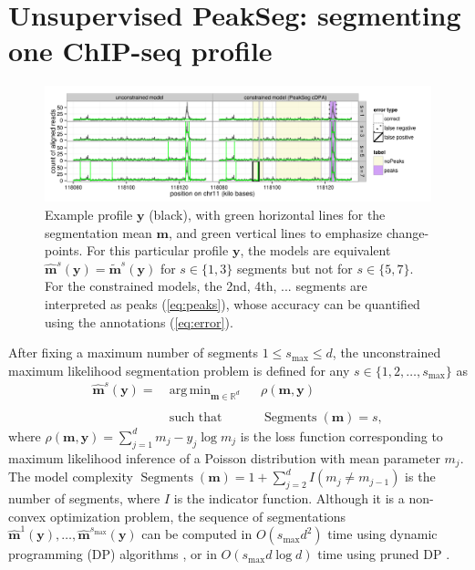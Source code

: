 \documentclass{article}
\DeclareMathOperator*{\argmin}{arg\,min}
\DeclareMathOperator*{\Segments}{Segments}
\newcommand{\RR}{\mathbb R}
\begin{document}
\section{Unsupervised PeakSeg: segmenting one ChIP-seq profile}

\begin{figure}[b!]
  \centering
  \includegraphics[width=\textwidth]{figure-Segmentor-PeakSeg}
  \vskip -0.5cm
  \caption{Example profile $\mathbf y$ (black), with green horizontal
    lines for the segmentation mean $\mathbf m$, and green vertical
    lines to emphasize change-points. For this particular profile
    $\mathbf y$, the models are equivalent $\mathbf{\hat m}^s(\mathbf
    y) = \mathbf{\tilde m}^s(\mathbf y)$ for $s\in\{1, 3\}$ segments
    but not for $s\in\{5, 7\}$. For the constrained models, the 2nd,
    4th, ...  segments are interpreted as peaks (\ref{eq:peaks}), whose
    accuracy can be quantified using the annotations
    (\ref{eq:error}).}
  \label{fig:profiles}
\end{figure}

After fixing a maximum number of segments $1 \leq s_{\text{max}}\leq d$,
the unconstrained maximum likelihood segmentation problem is defined
for any $s\in\{1, 2, \dots, s_{\max}\}$ as
\begin{equation}
  \label{argmin:unconstrained}
  \begin{aligned}
    \mathbf{\hat m}^s(\mathbf y)  =\ 
    &\argmin_{\mathbf m\in\RR^{d}} && 
    \rho
    (\mathbf m, \mathbf y) \\
    \\
    &\text{such that} && \Segments(\mathbf m)=s,
  \end{aligned}
\end{equation}
where $\rho(\mathbf m, \mathbf y)= \sum_{j=1}^d m_j - y_j \log m_j$ is
the loss function corresponding to maximum likelihood inference of a
Poisson distribution with mean parameter $m_j$. The model complexity
$\Segments(\mathbf m)=1+\sum_{j=2}^d I(m_j \neq m_{j-1})$ is the
number of segments, where $I$ is the indicator function. Although it
is a non-convex optimization problem, the sequence of segmentations
$\mathbf{\hat m}^1(\mathbf y), \dots, \mathbf{\hat
  m}^{s_{\text{max}}}(\mathbf y)$ can be computed in $O(s_{\text{max}}
d^2)$ time using dynamic programming (DP) algorithms \citep{bellman},
or in $O(s_{\text{max}} d \log d)$ time using pruned DP
\citep{pruned-dp, Segmentor}.
\end{document}
